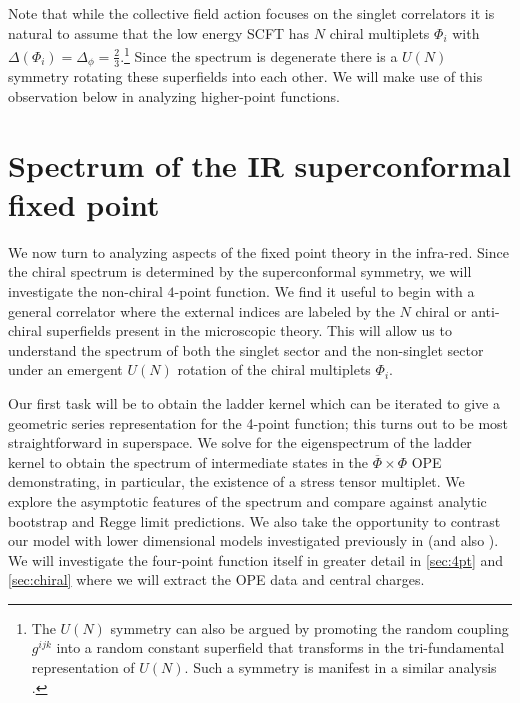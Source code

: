 \documentclass[11pt]{article}
\newcommand{\Phib}{\overline{\Phi}}
\begin{document}
Note that while the collective field action focuses on the singlet correlators it is natural to assume that the low energy SCFT has $N$ chiral multiplets $\Phi_i$ with $\Delta(\Phi_i) = \Delta_\phi = \frac{2}{3}$.\footnote{The $U(N)$ symmetry can also be argued by promoting the random coupling $g^{ijk}$ into a random constant superfield that transforms in the tri-fundamental representation of $U(N)$. Such a symmetry is manifest in a similar analysis \cite{Peng:2017kro}.} Since the spectrum is degenerate there is a $U(N)$ symmetry rotating these superfields into each other. We will make use of this observation below in analyzing higher-point functions.

\section{Spectrum of the IR superconformal fixed point}
\label{sec:ir}

We now turn to analyzing aspects of the fixed point  theory in the infra-red. Since the chiral spectrum is determined by the superconformal symmetry, we will investigate the non-chiral $4$-point function. We find it useful to begin with a general correlator where the external indices are labeled by the $N$ chiral or anti-chiral superfields present in the microscopic theory. This will allow us to understand the spectrum of both the singlet sector and the non-singlet sector under an emergent $U(N)$ rotation of the chiral multiplets $\Phi_i$. 

Our first task will be to obtain the ladder kernel which can be iterated to give a geometric series representation for the 4-point function; this turns out to be most straightforward in superspace. We solve for the eigenspectrum of the ladder kernel to obtain the spectrum of intermediate states in the $\Phib \times \Phi$ OPE demonstrating, in particular, the existence of a stress tensor multiplet.  We explore the asymptotic features of the spectrum and compare against analytic bootstrap and Regge limit predictions. We also take the opportunity to contrast our model with lower dimensional models investigated previously in \cite{Anninos:2016szt,Murugan:2017eto} (and also \cite{Fu:2016vas,Peng:2018zap,Bulycheva:2018qcp}).  We will investigate the four-point function itself in greater detail in \cref{sec:4pt} and \cref{sec:chiral} where we will extract the OPE data and central charges. 


\end{document}
